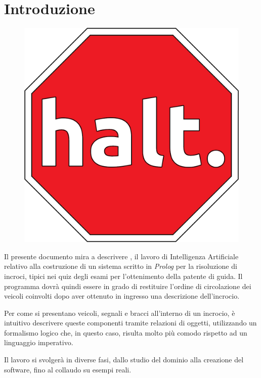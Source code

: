 \chapter{Introduzione}

\vspace{-4em}

\begin{figure}[!htb]
	\centering
	\includegraphics[scale=.15]{images/halt}
\end{figure}

Il presente documento mira a descrivere , il lavoro di Intelligenza Artificiale relativo alla costruzione di un sistema scritto in \emph{Prolog} per la risoluzione di incroci, tipici nei quiz degli esami per l'ottenimento della patente di guida. Il programma dovrà quindi essere in grado di restituire l'ordine di circolazione dei veicoli coinvolti dopo aver ottenuto in ingresso una descrizione dell'incrocio.

Per come si presentano veicoli, segnali e bracci all'interno di un incrocio, è intuitivo descrivere queste componenti tramite relazioni di oggetti, utilizzando un formalismo logico che, in questo caso, risulta molto più comodo rispetto ad un linguaggio imperativo. 

Il lavoro si svolgerà in diverse fasi, dallo studio del dominio alla creazione del software, fino al collaudo su esempi reali.
